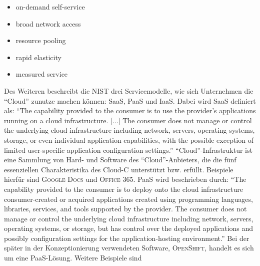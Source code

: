 \begin{itemize}
	\item on-demand self-service
	\item broad network access
	\item resource pooling
	\item rapid elasticity
	\item measured service
\end{itemize}
Des Weiteren beschreibt die \ac{NIST} drei Servicemodelle, wie sich Unternehmen die \enquote{Cloud} zunutze machen können: \ac{SaaS}, \ac{PaaS} und \ac{IaaS}. Dabei wird \ac{SaaS} definiert als: \enquote{The capability  provided to the consumer is to use the provider’s applications running on a cloud infrastructure. [...] The consumer does not manage or control the underlying cloud infrastructure including network, servers, operating systems, storage, or even individual application capabilities, with the possible exception of limited user-specific application configuration settings.}\autocite[][S.\,2]{mell_nist_2011} \enquote{Cloud}-Infrastruktur ist eine Sammlung von Hard- und Software des \enquote{Cloud}-Anbieters, die die fünf essenziellen Charakteristika des \ac{Cloud-C} unterstützt bzw. erfüllt. Beispiele hierfür sind \textsc{Google Docs} und \textsc{Office 365}. \ac{PaaS} wird beschrieben durch: \enquote{The capability provided to the consumer is to deploy onto the cloud infrastructure consumer-created or acquired applications created using programming languages, libraries, services, and tools supported by the provider. The consumer does
not manage or control the underlying cloud infrastructure including network, servers, operating systems, or storage, but has control over the deployed applications and possibly configuration settings for the application-hosting environment.}\autocite[][S.\,2]{mell_nist_2011} Bei der später in der Konzeptionierung verwendeten Software, \textsc{OpenShift}, handelt es sich um eine \ac{PaaS}-Lösung. Weitere Beispiele sind 
